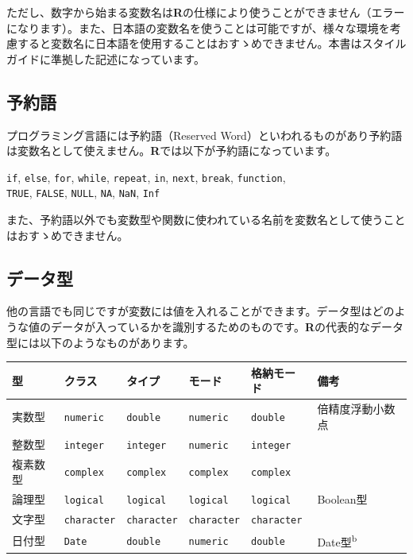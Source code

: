 \documentclass[
  12pt,
]{book}
\begin{document}
ただし、数字から始まる変数名は\textbf{R}の仕様により使うことができません（エラーになります）。また、日本語の変数名を使うことは可能ですが、様々な環境を考慮すると変数名に日本語を使用することはおすゝめできません。本書はスタイルガイドに準拠した記述になっています。

\hypertarget{ux4e88ux7d04ux8a9e}{%
\subsection{予約語}\label{ux4e88ux7d04ux8a9e}}

プログラミング言語には予約語（Reserved Word）といわれるものがあり予約語は変数名として使えません。\textbf{R}では以下が予約語になっています。

\texttt{if}, \texttt{else}, \texttt{for}, \texttt{while}, \texttt{repeat}, \texttt{in}, \texttt{next}, \texttt{break}, \texttt{function},\\
\texttt{TRUE}, \texttt{FALSE}, \texttt{NULL}, \texttt{NA}, \texttt{NaN}, \texttt{Inf}

また、予約語以外でも変数型や関数に使われている名前を変数名として使うことはおすゝめできません。

\hypertarget{ux30c7ux30fcux30bfux578b}{%
\subsection{データ型}\label{ux30c7ux30fcux30bfux578b}}

他の言語でも同じですが変数には値を入れることができます。データ型はどのような値のデータが入っているかを識別するためのものです。\textbf{R}の代表的なデータ型には以下のようなものがあります。

\begin{longtable}[]{@{}llllll@{}}
\toprule
型 & クラス & タイプ & モード & 格納モード & 備考 \\
\midrule
\endhead
実数型 & \texttt{numeric} & \texttt{double} & \texttt{numeric} & \texttt{double} & 倍精度浮動小数点 \\
整数型 & \texttt{integer} & \texttt{integer} & \texttt{numeric} & \texttt{integer} & \\
複素数型 & \texttt{complex} & \texttt{complex} & \texttt{complex} & \texttt{complex} & \\
論理型 & \texttt{logical} & \texttt{logical} & \texttt{logical} & \texttt{logical} & Boolean型 \\
文字型 & \texttt{character} & \texttt{character} & \texttt{character} & \texttt{character} & \\
日付型 & \texttt{Date} & \texttt{double} & \texttt{numeric} & \texttt{double} & Date型\textsuperscript{b} \\
\bottomrule
\end{longtable}
\end{document}
